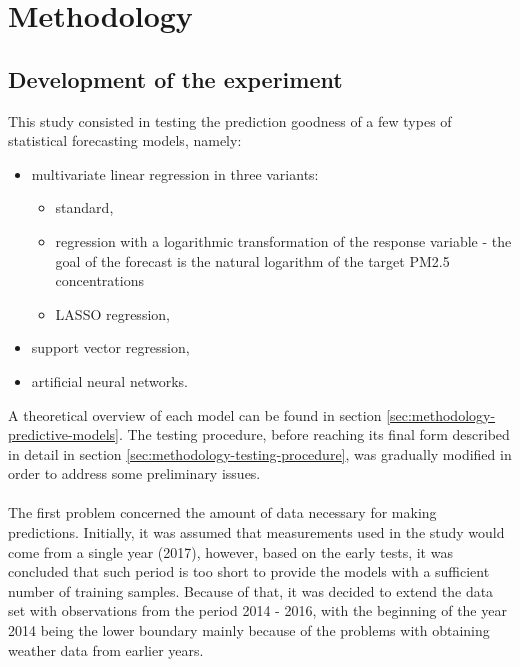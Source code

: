 \chapter{Methodology}\label{chap:methodology}

\section{Development of the experiment}\label{sec:methodology-development}
This study consisted in testing the prediction goodness of a few types of statistical forecasting models, namely: 
\begin{itemize}
    \item multivariate linear regression in three variants:
    \begin{itemize}
        \item standard,
        \item regression with a logarithmic transformation of the response variable  - the goal of the forecast is the natural logarithm of the target PM2.5 concentrations
        \item LASSO regression,
    \end{itemize}
    \item support vector regression,
    \item artificial neural networks.
\end{itemize}
A theoretical overview of each model can be found in section \ref{sec:methodology-predictive-models}. The testing procedure, before reaching its final form described in detail in section \ref{sec:methodology-testing-procedure}, was gradually modified in order to address some preliminary issues.
\\\\
The first problem concerned the amount of data necessary for making predictions. Initially, it was assumed that measurements used in the study would come from a single year (2017), however, based on the early tests, it was concluded that such period is too short to provide the models with a sufficient number of training samples. Because of that, it was decided to extend the data set with observations from the period 2014 - 2016, with the beginning of the year 2014 being the lower boundary mainly because of the problems with obtaining weather data from earlier years.
\\\\

